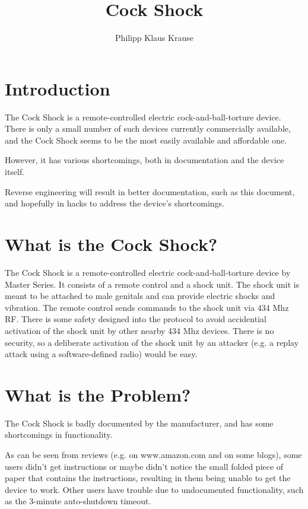 \documentclass[a4paper]{article}
\begin{document}
\title{Cock Shock}
\author{Philipp Klaus Krause}

\maketitle

\section{Introduction}

The Cock Shock is a remote-controlled electric cock-and-ball-torture device. There is only a small number of such devices currently commercially available, and the Cock Shock seems to be the most easily available and affordable one.

However, it has various shortcomings, both in documentation and the device itself.

Reverse engineering will result in better documentation, such as this document, and hopefully in hacks to address the device's shortcomings.

\section{What is the Cock Shock?}

The Cock Shock is a remote-controlled electric cock-and-ball-torture device by Master Series. It consists of a remote control and a shock unit. The shock unit is meant to be attached to male genitals and can provide electric shocks and vibration. The remote control sends commands to the shock unit via 434 Mhz RF. There is some safety designed into the protocol to avoid accidential activation of the shock unit by other nearby 434 Mhz devices. There is no security, so a deliberate activation of the shock unit by an attacker (e.g. a replay attack using a software-defined radio) would be easy.

\section{What is the Problem?}

The Cock Shock is badly documented by the manufacturer, and has some shortcomings in functionality.

As can be seen from reviews (e.g. on www.amazon.com and on some blogs), some users didn't get instructions or maybe didn't notice the small folded piece of paper that contains the instructions, resulting in them being unable to get the device to work. Other users have trouble due to undocumented functionality, such as the 3-minute auto-shutdown timeout.
\end{document}
